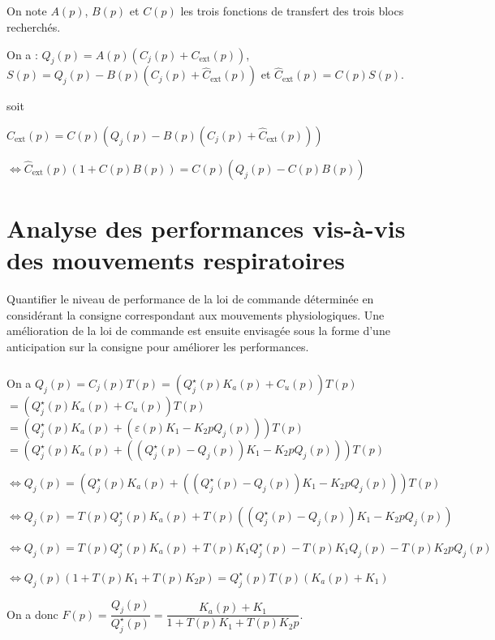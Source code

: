 \documentclass[10pt,fleqn]{article} %
\begin{document}
\subparagraph{}%
On note $A(p)$, $B(p)$ et $C(p)$ les trois fonctions de transfert des trois blocs recherchés. 


On a : $Q_j(p)=A(p)\left(C_j(p)+C_{\text{ext}}(p)\right)$, 
$S(p)=Q_j(p)-B(p)\left( C_j(p)+\hat{C}_{\text{ext}}(p) \right)$
et  $\hat{C}_{\text{ext}}(p)=C(p)S(p)$.

 soit 

$\hat{C}_{\text{ext}}(p)=C(p)\left(Q_j(p)-B(p)\left( C_j(p)+\hat{C}_{\text{ext}}(p) \right)\right)$

$\Leftrightarrow \hat{C}_{\text{ext}}(p) \left(1+ C(p)B(p)\right)=C(p)\left(Q_j(p)-C(p)B(p) \right)$

\subparagraph{}%

\subparagraph{}%

\subparagraph{}%


\section{Analyse des performances vis-à-vis des mouvements respiratoires}
\begin{obj}
Quantifier le niveau de performance de la loi de commande déterminée en considérant la consigne
correspondant aux mouvements physiologiques. Une amélioration de la loi de commande est ensuite
envisagée sous la forme d’une anticipation sur la consigne pour améliorer les performances.
\end{obj}


\subparagraph{}\textit{}%
\subparagraph{}\textit{}%

\subparagraph{}\textit{}%

On a $Q_j(p) = C_j(p) T(p)= \left( Q_j^{\star}(p) K_a(p) + C_u(p) \right) T(p)$
$= \left( Q_j^{\star}(p) K_a(p) + C_u(p) \right) T(p)$
$= \left( Q_j^{\star}(p) K_a(p) + \left( \varepsilon(p) K_1 - K_2 p Q_j(p) \right)\right) T(p)$
$= \left( Q_j^{\star}(p) K_a(p) + \left( \left(Q_j^{\star}(p) - Q_j(p) \right) K_1 - K_2 p Q_j(p) \right)\right) T(p)$


$\Leftrightarrow Q_j(p) = 
\left(
    Q_j^{\star}(p) K_a(p) + 
    \left( 
        \left(Q_j^{\star}(p) - Q_j(p) \right) K_1 - K_2 p Q_j(p) 
    \right)
\right) T(p)$

$\Leftrightarrow Q_j(p) = 
    T(p)Q_j^{\star}(p) K_a(p) + 
    T(p)\left( 
        \left(Q_j^{\star}(p) - Q_j(p) \right) K_1 - K_2 p Q_j(p) 
    \right) $

$\Leftrightarrow Q_j(p) = 
    T(p)Q_j^{\star}(p) K_a(p) + 
        T(p)K_1 Q_j^{\star}(p) -T(p)K_1  Q_j(p)   - T(p)K_2 p Q_j(p) 
     $

$\Leftrightarrow Q_j(p)\left(1     +T(p)K_1     + T(p)K_2 p\right)= 
      Q_j^{\star}(p)T(p) \left(  K_a(p)     +K_1 \right)     $

On a donc $F(p)=\dfrac{Q_j(p)}{Q_j^{\star}(p)}=\dfrac{ K_a(p) +K_1}{1+T(p)K_1 + T(p)K_2 p}$.
\end{document}
